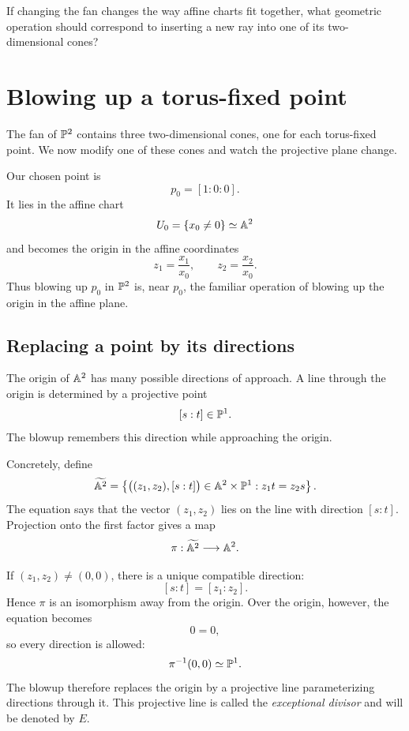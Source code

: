 \begin{guidingquestion}
If changing the fan changes the way affine charts fit together, what
geometric operation should correspond to inserting a new ray into one
of its two-dimensional cones?
\end{guidingquestion}


\section{Blowing up a torus-fixed point}
\label{sec:p2-first-blowup}

The fan of \(\mathbb{P}^2\) contains three two-dimensional cones, one for
each torus-fixed point. We now modify one of these cones and watch the
projective plane change.

Our chosen point is
\[
p_0=[1:0:0].
\]
It lies in the affine chart
\[
U_0=\{x_0\neq0\}\simeq\mathbb{A}^2
\]
and becomes the origin in the affine coordinates
\[
z_1=\frac{x_1}{x_0},
\qquad
z_2=\frac{x_2}{x_0}.
\]
Thus blowing up \(p_0\) in \(\mathbb{P}^2\) is, near \(p_0\), the familiar
operation of blowing up the origin in the affine plane.

\subsection{Replacing a point by its directions}

The origin of \(\mathbb{A}^2\) has many possible directions of approach.
A line through the origin is determined by a projective point
\[
[s:t]\in\mathbb{P}^1.
\]
The blowup remembers this direction while approaching the origin.

Concretely, define
\[
\widetilde{\mathbb{A}^2}
=
\left\{
\bigl((z_1,z_2),[s:t]\bigr)\in\mathbb{A}^2\times\mathbb{P}^1
:
z_1t=z_2s
\right\}.
\]
The equation says that the vector \((z_1,z_2)\) lies on the line with
direction \([s:t]\). Projection onto the first factor gives a map
\[
\pi:\widetilde{\mathbb{A}^2}\longrightarrow\mathbb{A}^2.
\]

If \((z_1,z_2)\neq(0,0)\), there is a unique compatible direction:
\[
[s:t]=[z_1:z_2].
\]
Hence \(\pi\) is an isomorphism away from the origin. Over the origin,
however, the equation becomes
\[
0=0,
\]
so every direction is allowed:
\[
\pi^{-1}(0,0)\simeq\mathbb{P}^1.
\]
The blowup therefore replaces the origin by a projective line
parameterizing directions through it. This projective line is called
the \emph{exceptional divisor} and will be denoted by \(E\).

